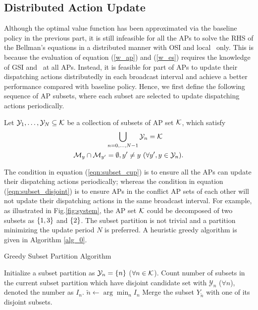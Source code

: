 \subsection{Distributed Action Update}
\label{subsec:ap_alg}
Although the optimal value function has been approximated via the baseline policy in the previous part, it is still infeasible for all the APs to solve the RHS of the Bellman's equations in a distributed manner with OSI and local \brlatency~only.
This is because the evaluation of equation (\ref{w_ap}) and (\ref{w_es}) requires the knowledge of GSI and \brlatency~at all APs.
Instead, it is feasible for part of APs to update their dispatching actions distributedly in each broadcast interval and achieve a better performance compared with baseline policy.
Hence, we first define the following sequence of AP subsets, where each subset are selected to update dispatching actions periodically.
\begin{definition}
    Let $\mathcal{Y}_{1}, \dots, \mathcal{Y}_{N} \subseteq \mathcal{K}$ be a collection of subsets of AP set $\mathcal{K}$, which satisfy
    \begin{align}
        &\bigcup_{n=0,\dots,N-1} \mathcal{Y}_{n} = \mathcal{K}
        \label{eqn:subset_cup}
        \\
        \mathcal{M}_{y} \cap \mathcal{M}_{y'} &=\emptyset, y' \neq y~(\forall y',y \in \mathcal{Y}_{n}).
        \label{eqn:subset_disjoint}
    \end{align}
\end{definition}
The condition in equation (\ref{eqn:subset_cup}) is to ensure all the APs can update their dispatching actions periodically; whereas the condition in equation (\ref{eqn:subset_disjoint}) is to ensure APs in the conflict AP sets of each other will not update their dispatching actions in the same broadcast interval.
For example, as illustrated in Fig.\ref{fig:system}, the AP set $\mathcal{K}$ could be decomposed of two subsets as $\{1,3\}$ and $\{2\}$.
The subset partition is not trivial and a partition minimizing the update period $N$ is preferred.
A heuristic greedy algorithm is given in Algorithm \ref{alg_0}.
\begin{algorithm}[ht]
    \caption{Greedy Subset Partition Algorithm}\label{alg_0}
    \DontPrintSemicolon %
    Initialize a subset partition as $\mathcal{Y}_{n} = \{n\}$ ($\forall n\in\mathcal{K}$).\;
    {
        Count number of subsets in the current subset partition which have disjoint candidate set with $\mathcal{Y}_n$ ($\forall n$), denoted the number as $I_{n}$.\;
        $\tilde{n} \gets \arg\min_{n} I_{n}$\;
        Merge the subset $Y_{\tilde{n}}$ with one of its disjoint subsets.\;
    }
\end{algorithm}

